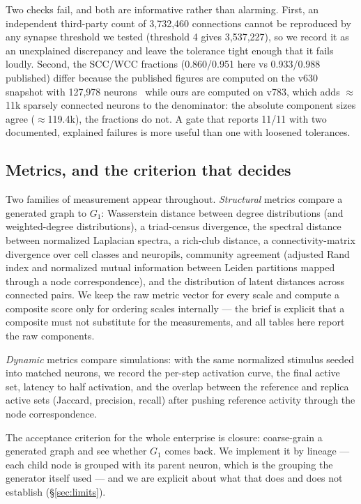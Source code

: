 \documentclass[11pt,a4paper]{article}
\newcommand{\gaa}{$G_1$}
\begin{document}
Two checks fail, and both are informative rather than alarming. First, an independent
third-party count of 3{,}732{,}460 connections cannot be reproduced by any synapse threshold we
tested (threshold 4 gives 3{,}537{,}227), so we record it as an unexplained discrepancy and
leave the tolerance tight enough that it fails loudly. Second, the SCC/WCC fractions
(0.860/0.951 here vs 0.933/0.988 published) differ because the published figures are computed on
the v630 snapshot with 127{,}978 neurons~\cite{flywire-network} while ours are computed on v783,
which adds $\approx$11k sparsely connected neurons to the denominator: the absolute component
sizes agree ($\approx$119.4k), the fractions do not. A gate that reports 11/11 with two
documented, explained failures is more useful than one with loosened tolerances.

\label{tab:gate}


\subsection{Metrics, and the criterion that decides}
Two families of measurement appear throughout. \emph{Structural} metrics compare a generated
graph to \gaa: Wasserstein distance between degree distributions (and weighted-degree
distributions), a triad-census divergence, the spectral distance between normalized Laplacian
spectra, a rich-club distance, a connectivity-matrix divergence over cell classes and neuropils,
community agreement (adjusted Rand index and normalized mutual information between Leiden
partitions mapped through a node correspondence), and the distribution of latent distances across
connected pairs. We keep the raw metric vector for every scale and compute a composite score only
for ordering scales internally --- the brief is explicit that a composite must not substitute for
the measurements, and all tables here report the raw components.

\emph{Dynamic} metrics compare simulations: with the same normalized stimulus seeded into
matched neurons, we record the per-step activation curve, the final active set, latency to half
activation, and the overlap between the reference and replica active sets (Jaccard, precision,
recall) after pushing reference activity through the node correspondence.

The acceptance criterion for the whole enterprise is closure: coarse-grain a generated graph and
see whether \gaa{} comes back. We implement it by lineage --- each child node is grouped with its
parent neuron, which is the grouping the generator itself used --- and we are explicit about what
that does and does not establish (\S\ref{sec:limits}).
\end{document}

